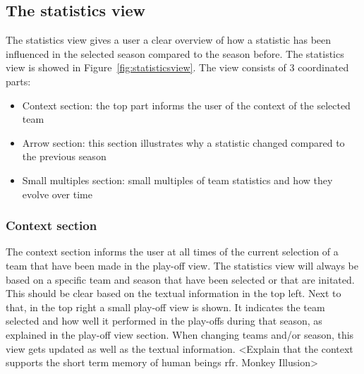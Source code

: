 \documentclass{sigchi}
\begin{document}
\subsection{The statistics view}
The statistics view gives a user a clear overview of how a statistic has been influenced in the selected season compared to the season before. The statistics view is showed in Figure~\ref{fig:statisticsview}. The view consists of 3 coordinated parts:
\begin{itemize}
    \item Context section: the top part informs the user of the context of the selected team
    \item Arrow section: this section illustrates why a statistic changed compared to the previous season
    \item Small multiples section: small multiples of team statistics and how they evolve over time
\end{itemize}

\subsubsection{Context section}
The context section informs the user at all times of the current selection of a team  
that have been made in the play-off view. The statistics view will always be based on a specific team and season that have been selected or that are initated. This should be clear based on the textual information in the top left. Next to that, in the top right a small play-off view is shown. It indicates the team selected and how well it performed in  the play-offs during that season, as explained in the play-off view section. When changing teams and/or season, this view gets updated as well as the textual information. <Explain that the context supports the short term memory of human beings rfr. Monkey Illusion>
\end{document}
